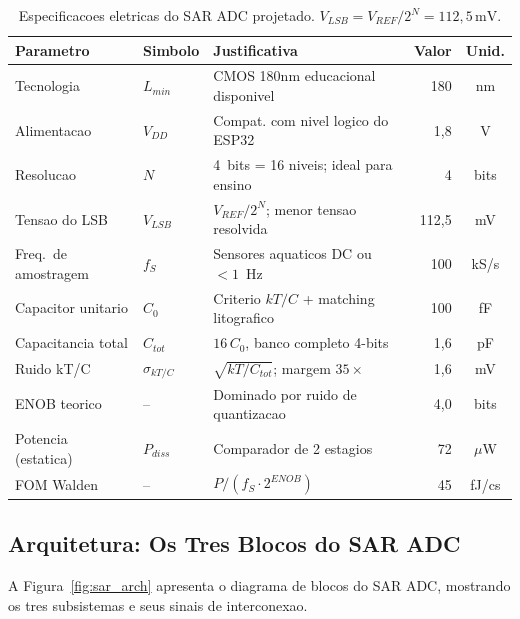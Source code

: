 \documentclass[12pt, a4paper]{article}
\begin{document}
\begin{table}[H]
\centering
\small
\caption{Especificacoes eletricas do SAR ADC projetado. $V_{LSB} = V_{REF}/2^N = 112{,}5\,\text{mV}$.}
\label{tab:specs}
\begin{tabular}{p{3.0cm}p{1.6cm}p{5.0cm}rc}
\toprule
\textbf{Parametro} & \textbf{Simbolo} & \textbf{Justificativa} & \textbf{Valor} & \textbf{Unid.}\\
\midrule
Tecnologia          & $L_{min}$  & CMOS 180nm educacional disponivel        & 180    & nm \\
Alimentacao         & $V_{DD}$   & Compat. com nivel logico do ESP32        & 1,8    & V \\
Resolucao           & $N$        & 4~bits = 16 niveis; ideal para ensino    & 4      & bits \\
Tensao do LSB       & $V_{LSB}$  & $V_{REF}/2^N$; menor tensao resolvida    & 112,5  & mV \\
Freq.\ de amostragem & $f_S$     & Sensores aquaticos DC ou $< 1$~Hz        & 100    & kS/s \\
Capacitor unitario  & $C_0$      & Criterio $kT/C$ + matching litografico   & 100    & fF \\
Capacitancia total  & $C_{tot}$  & $16\,C_0$, banco completo 4-bits         & 1,6    & pF \\
Ruido kT/C          & $\sigma_{kT/C}$ & $\sqrt{kT/C_{tot}}$; margem $35\times$ & 1,6 & mV \\
ENOB teorico        & --         & Dominado por ruido de quantizacao        & 4,0    & bits \\
Potencia (estatica) & $P_{diss}$ & Comparador de 2 estagios                 & 72     & $\mu$W \\
FOM Walden          & --         & $P/(f_S \cdot 2^{ENOB})$                 & 45     & fJ/cs \\
\bottomrule
\end{tabular}
\end{table}

\subsection{Arquitetura: Os Tres Blocos do SAR ADC}

A Figura~\ref{fig:sar_arch} apresenta o diagrama de blocos do SAR ADC, mostrando os tres
subsistemas e seus sinais de interconexao.
\end{document}

